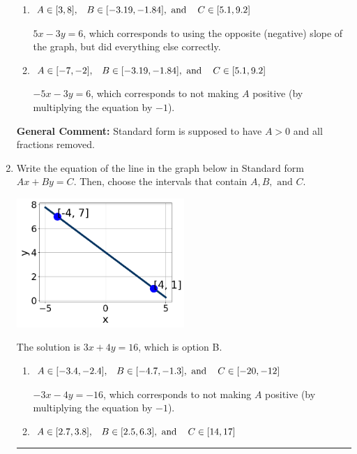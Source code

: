 \documentclass{extbook}[14pt]
\newcommand{\litem}[1]{\item #1

\rule{\textwidth}{0.4pt}}
\begin{document}
\begin{enumerate}
{\begin{enumerate}[label=\Alph*.]
* $5x + 3y = -6$, which is the correct option.
\item \( A \in [3, 8], \hspace{3mm} B \in [-3.19, -1.84], \text{ and } \hspace{3mm} C \in [5.1, 9.2] \)

 $5x - 3y = 6$, which corresponds to using the opposite (negative) slope of the graph, but did everything else correctly.
\item \( A \in [-7, -2], \hspace{3mm} B \in [-3.19, -1.84], \text{ and } \hspace{3mm} C \in [5.1, 9.2] \)

 $-5x - 3y = 6$, which corresponds to not making $A$ positive (by multiplying the equation by $-1$).
\end{enumerate}

\textbf{General Comment:} Standard form is supposed to have $A > 0$ and all fractions removed.
}
\litem{
Write the equation of the line in the graph below in Standard form $Ax+By=C$. Then, choose the intervals that contain $A, B, \text{ and } C$.

\begin{center}
    \includegraphics[width=0.5\textwidth]{../Figures/linearGraphToStandardC.png}
\end{center}


The solution is \( 3x + 4y = 16 \), which is option B.\begin{enumerate}[label=\Alph*.]
\item \( A \in [-3.4, -2.4], \hspace{3mm} B \in [-4.7, -1.3], \text{ and } \hspace{3mm} C \in [-20, -12] \)

 $-3x - 4y = -16$, which corresponds to not making $A$ positive (by multiplying the equation by $-1$).
\item \( A \in [2.7, 3.8], \hspace{3mm} B \in [2.5, 6.3], \text{ and } \hspace{3mm} C \in [14, 17] \)


\end{enumerate}}
\end{enumerate}
\end{document}
